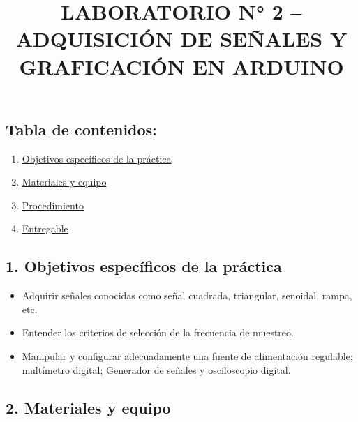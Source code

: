 \documentclass[
  letterpaper,
  DIV=11,
  numbers=noendperiod]{scrartcl}
\title{LABORATORIO N° 2 -- ADQUISICIÓN DE SEÑALES Y GRAFICACIÓN EN
ARDUINO}
\author{}
\date{}
\providecommand{\tightlist}{%
  \setlength{\itemsep}{0pt}\setlength{\parskip}{0pt}}\usepackage{longtable,booktabs,array}
\begin{document}
\maketitle


\subsection{Tabla de contenidos:}\label{tabla-de-contenidos}

\begin{enumerate}
\def\labelenumi{\arabic{enumi}.}
\tightlist
\item
  \hyperref[1-objetivos-especuxedficos-de-la-pruxe1ctica]{Objetivos
  específicos de la práctica}
\item
  \hyperref[2-materiales-y-equipo]{Materiales y equipo}
\item
  \hyperref[3-procedimiento]{Procedimiento}
\item
  \hyperref[4-entregable]{Entregable}
\end{enumerate}

\subsection{1. Objetivos específicos de la
práctica}\label{objetivos-especuxedficos-de-la-pruxe1ctica}

\begin{itemize}
\tightlist
\item
  Adquirir señales conocidas como señal cuadrada, triangular, senoidal,
  rampa, etc.
\item
  Entender los criterios de selección de la frecuencia de muestreo.
\item
  Manipular y configurar adecuadamente una fuente de alimentación
  regulable; multímetro digital; Generador de señales y osciloscopio
  digital.
\end{itemize}

\subsection{2. Materiales y equipo}\label{materiales-y-equipo}
\end{document}
